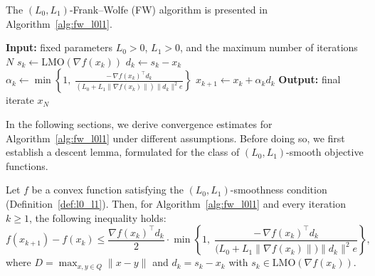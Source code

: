 \documentclass[runningheads]{llncs}
\begin{document}
	The $(L_0,L_1)$-Frank–Wolfe (FW) algorithm is presented in Algorithm~\ref{alg:fw_l0l1}.
	
	\begin{algorithm}
		\caption{$(L_0,L_1)$-Frank–Wolfe Algorithm ($(L_0,L_1)$-FW)}
		\label{alg:fw_l0l1}
		\begin{algorithmic}[1]
			\State \textbf{Input:} fixed parameters $L_0 > 0$, $L_1 > 0$, and the maximum number of iterations $N$
			\State $s_k \gets \mathrm{LMO}(\nabla f(x_k))$
			\State $d_k \gets s_k - x_k$
			\State $\displaystyle 
			\alpha_k \gets \min \left\{ 1,\;
			\frac{-\, \nabla f(x_k)^\top d_k}{\left(L_0 + L_1 \|\nabla f(x_k)\|\right) \|d_k\|^2 e} \right\}$
			\State $x_{k+1} \gets x_k + \alpha_k d_k$
			\EndFor
			\State \textbf{Output:} final iterate $x_N$
		\end{algorithmic}
	\end{algorithm}
	
	In the following sections, we derive convergence estimates for Algorithm~\ref{alg:fw_l0l1} under different assumptions.  
	Before doing so, we first establish a descent lemma, formulated for the class of $(L_0,L_1)$-smooth objective functions.
	
	\begin{lemma}\label{lemma:descent_lemma}
		Let $f$ be a convex function satisfying the $(L_{0},L_{1})$-smoothness condition (Definition~\ref{def:l0_l1}).  
		Then, for Algorithm~\ref{alg:fw_l0l1} and every iteration $k \ge 1$, the following inequality holds:
		\begin{equation*}
			f(x_{k+1}) - f(x_{k}) 
			\le \frac{\nabla f(x_{k})^{\top} d_{k}}{2}
			\cdot 
			\min\!\left\{1,\;
			\frac{-\,\nabla f(x_{k})^{\top} d_{k}}
			{\big(L_{0}+L_{1}\|\nabla f(x_{k})\|\big)\|d_{k}\|^{2}e}
			\right\},
		\end{equation*}
		where $D = \max_{x,y \in Q}\|x-y\|$ and $d_{k}=s_{k}-x_{k}$ with 
		$s_{k}\in \mathrm{LMO}(\nabla f(x_{k}))$.
	\end{lemma}
	
\end{document}
